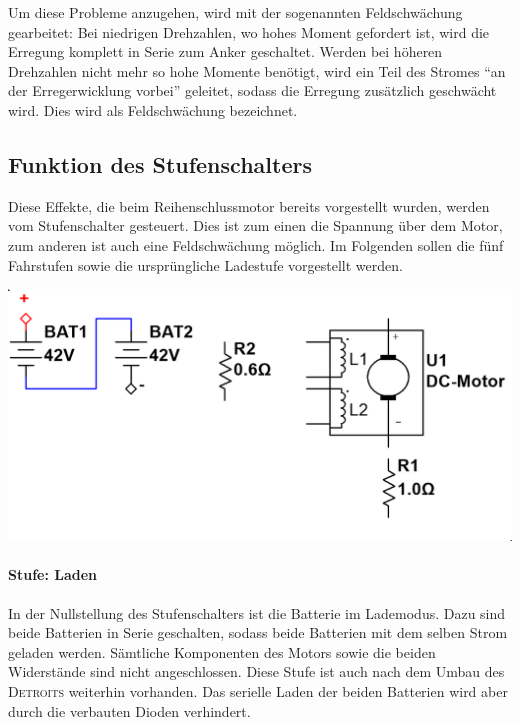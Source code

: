 Um diese Probleme anzugehen, wird mit der sogenannten Feldschwächung gearbeitet: Bei niedrigen Drehzahlen, wo hohes Moment gefordert ist, wird die Erregung komplett in Serie zum Anker geschaltet. Werden bei höheren Drehzahlen nicht mehr so hohe Momente benötigt, wird ein Teil des Stromes "`an der Erregerwicklung vorbei"' 
geleitet, sodass die Erregung zusätzlich geschwächt wird. Dies wird als Feldschwächung bezeichnet.

\subsection{Funktion des Stufenschalters}

Diese Effekte, die beim Reihenschlussmotor bereits vorgestellt wurden, werden vom Stufenschalter gesteuert. Dies ist zum einen die Spannung über dem Motor, zum anderen ist auch eine Feldschwächung möglich. Im Folgenden sollen die fünf Fahrstufen sowie die ursprüngliche Ladestufe vorgestellt werden.

\begin{minipage}{0.49\textwidth}
	\includegraphics[width=\columnwidth]{images/Stufenschalter/Laden.png}%
\end{minipage}
\begin{minipage}{0.5\textwidth}
	\paragraph{Stufe: Laden}
	In der Nullstellung des Stufenschalters ist die Batterie im Lademodus. Dazu sind beide Batterien in Serie geschalten, sodass beide Batterien mit dem selben Strom geladen werden. Sämtliche Komponenten des Motors sowie die beiden Widerstände sind nicht angeschlossen. Diese Stufe ist auch nach dem Umbau des \textsc{Detroits} weiterhin vorhanden. Das serielle Laden der beiden Batterien wird aber durch die verbauten Dioden verhindert.
\end{minipage}

